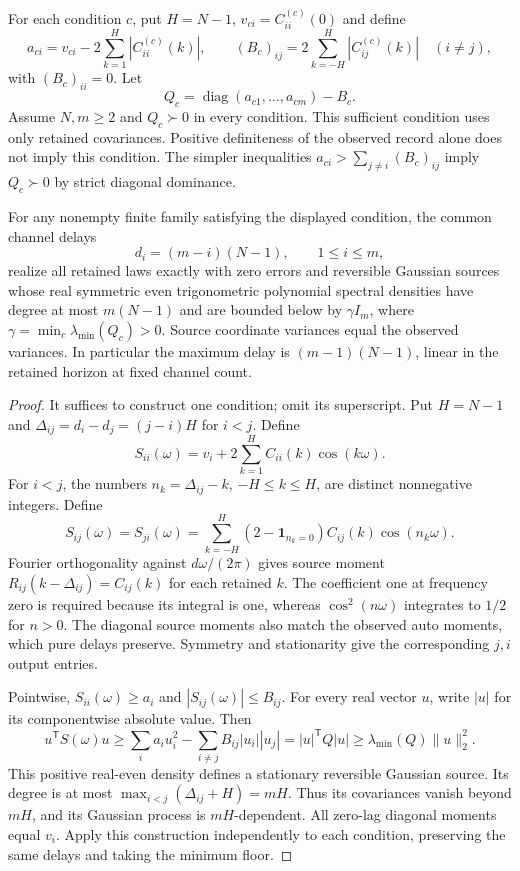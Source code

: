For each condition $c$, put $H=N-1$, $v_{ci}=C^{(c)}_{ii}(0)$ and define
\[
a_{ci}=v_{ci}-2\sum_{k=1}^{H}|C^{(c)}_{ii}(k)|,\qquad
(B_c)_{ij}=2\sum_{k=-H}^{H}|C^{(c)}_{ij}(k)|\quad(i\ne j),
\]
with $(B_c)_{ii}=0$. Let
\[
Q_c=\operatorname{diag}(a_{c1},\ldots,a_{cm})-B_c.
\]
Assume $N,m\ge2$ and $Q_c\succ0$ in every condition. This sufficient condition uses only retained covariances. Positive definiteness of the observed record alone does not imply this condition. The simpler inequalities $a_{ci}>\sum_{j\ne i}(B_c)_{ij}$ imply $Q_c\succ0$ by strict diagonal dominance.

\begin{theorem}\label{thm:linear-delay}
For any nonempty finite family satisfying the displayed condition, the common
channel delays
\[
 d_i=(m-i)(N-1),\qquad 1\le i\le m,
\]
realize all retained laws exactly with zero errors and reversible
Gaussian sources whose real symmetric even trigonometric polynomial spectral
densities have degree at most $m(N-1)$ and are bounded below by
$\gamma I_m$, where $\gamma=\min_c\lambda_{\min}(Q_c)>0$.
Source coordinate variances equal the observed variances. In particular
the maximum delay is $(m-1)(N-1)$, linear in the retained horizon at
fixed channel count.
\end{theorem}
\begin{proof}
It suffices to construct one condition; omit its superscript. Put
$H=N-1$ and $\Delta_{ij}=d_i-d_j=(j-i)H$ for $i<j$.
Define
\[
 S_{ii}(\omega)=v_i+2\sum_{k=1}^{H}C_{ii}(k)\cos(k\omega).
\]
For $i<j$, the numbers $n_k=\Delta_{ij}-k$, $-H\le k\le H$,
are distinct nonnegative integers. Define
\[
 S_{ij}(\omega)=S_{ji}(\omega)
 =\sum_{k=-H}^{H}(2-\mathbf1_{n_k=0})C_{ij}(k)\cos(n_k\omega).
\]
Fourier orthogonality against $d\omega/(2\pi)$ gives source moment
$R_{ij}(k-\Delta_{ij})=C_{ij}(k)$ for each retained $k$.
The coefficient one at frequency zero is required because its integral
is one, whereas $\cos^2(n\omega)$ integrates to $1/2$ for $n>0$.
The diagonal source moments also match the observed auto moments, which
pure delays preserve. Symmetry and stationarity give the corresponding
$j,i$ output entries.

Pointwise, $S_{ii}(\omega)\ge a_i$ and $|S_{ij}(\omega)|\le B_{ij}$. For every real vector $u$, write $|u|$ for its componentwise absolute value. Then
\[
u^{\mathsf T}S(\omega)u
\ge\sum_i a_i u_i^2-\sum_{i\ne j}B_{ij}|u_i||u_j|
=|u|^{\mathsf T}Q|u|
\ge\lambda_{\min}(Q)\|u\|_2^2.
\]
This positive real-even density defines a stationary reversible Gaussian
source. Its degree is at most
$\max_{i<j}(\Delta_{ij}+H)=mH$. Thus its covariances vanish beyond
$mH$, and its Gaussian process is $mH$-dependent. All zero-lag diagonal
moments equal $v_i$. Apply this construction independently to each
condition, preserving the same delays and taking the minimum floor.
\end{proof}
